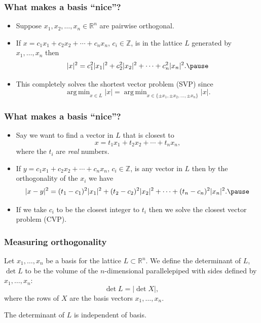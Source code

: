 \documentclass{beamer}
\newcommand{\integers}{\mathbb{Z}}
\newcommand{\reals}{\mathbb{R}}
\DeclareMathOperator*{\argmin}{arg\,min}
\begin{document}
\begin{frame}
	\frametitle{What makes a basis ``nice''?}
	\begin{itemize}
		\item Suppose $x_1, x_2, \ldots, x_n\in \reals^n$ are pairwise orthogonal.\pause
		\item If $x = c_1x_1+c_2x_2 + \cdots + c_nx_n$, $c_i\in \integers$, is in the lattice $L$ generated by $x_1, \ldots, x_n$ then
		\[
		|x|^2 = c_1^2|x_1|^2 + c_2^2|x_2|^2 + \cdots + c_n^2|x_n|^2.\pause
		\]
		\item This completely solves the shortest vector problem (SVP) since
		\[
		\argmin_{x\in L}|x| = \argmin_{x\in \{\pm x_1, \pm x_2, \ldots, \pm x_n\}}|x|.
		\]
	\end{itemize}
\end{frame}

\begin{frame}
	\frametitle{What makes a basis ``nice''?}
	\begin{itemize}
		\item Say we want to find a vector in $L$ that is closest to
		\[
		x = t_1x_1 + t_2x_2 + \cdots + t_nx_n,
		\]
		where the $t_i$ are \textit{real} numbers.\pause
		\item If $y = c_1x_1+c_2x_2 + \cdots + c_nx_n$, $c_i\in \integers$, is any vector in $L$ then by the orthogonality of the $x_i$ we have
		\[
		|x-y|^2 = (t_1-c_1)^2|x_1|^2 + (t_2-c_2)^2|x_2|^2 + \cdots + (t_n-c_n)^2|x_n|^2.\pause
		\]
		\item If we take $c_i$ to be the closest integer to $t_i$ then we solve the closest vector problem (CVP).
	\end{itemize}
\end{frame}

\begin{frame}
	\frametitle{Measuring orthogonality}
	\begin{definition}
		Let $x_1, \ldots, x_n$ be a basis for the lattice $L\subset \reals^n$. We define the determinant of $L$, $\det L$ to be the volume of the $n$-dimensional parallelepiped with sides defined by $x_1, \ldots, x_n$:
		\[
		\det L = |\det X|,
		\]
		where the rows of $X$ are the basis vectors $x_1, \ldots, x_n$.
	\end{definition}\pause
	\begin{theorem}
		The determinant of $L$ is independent of basis.
	\end{theorem}
\end{frame}
\end{document}
